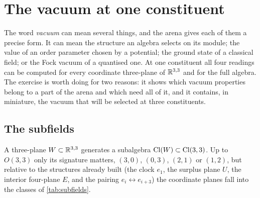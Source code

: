 

\section{The vacuum at one constituent}
\label{sec:subfields}

The word \emph{vacuum} can mean several things, and the arena gives each of them a precise form. It can mean the structure an algebra
selects on its module; the value of an order parameter chosen by a potential; the ground state of a classical field; or the Fock
vacuum of a quantised one. At one constituent all four readings can be computed for every coordinate three-plane of $\mathbb{R}^{3,3}$ and for the
full algebra. The exercise is worth doing for two reasons: it shows which vacuum properties belong to a part of the arena and which
need all of it, and it contains, in miniature, the vacuum that will be selected at three constituents.

\subsection{The subfields}

A three-plane $W\subset\mathbb{R}^{3,3}$ generates a subalgebra $\mathrm{Cl}(W)\subset\mathrm{Cl}(3,3)$. Up to $O(3,3)$ only its signature matters, $(3,0)$,
$(0,3)$, $(2,1)$ or $(1,2)$, but relative to the structures already built (the clock $e_1$, the surplus plane $U$, the interior four-plane
$E$, and the pairing $e_i\leftrightarrow e_{i+3}$) the coordinate planes fall into the classes of \cref{tab:subfields}.

